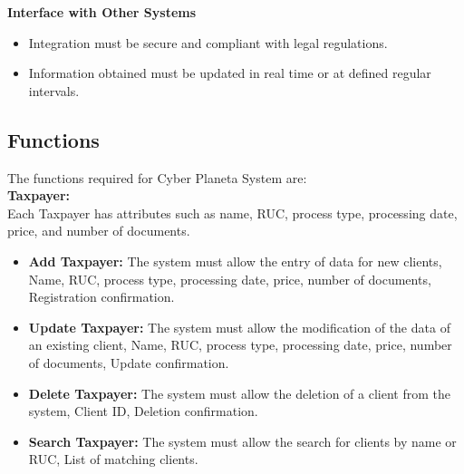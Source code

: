 \documentclass[12pt,a4paper, twosite]{article}
\begin{document}
\textbf {Interface with Other Systems}

\begin{itemize}
\item Integration must be secure and compliant with legal regulations.
\item Information obtained must be updated in real time or at defined regular intervals.
\end{itemize}

\subsection{Functions}
\label{sec:org307bb59}

The functions required for Cyber Planeta System are:\\

\textbf{Taxpayer:}\\
Each Taxpayer has attributes such as name, RUC, process type, processing date, price, and number of documents.
\begin{itemize}
\item \textbf {Add Taxpayer:}
The system must allow the entry of data for new clients, Name, RUC, process type, processing date, price, number of documents, Registration confirmation.
\end{itemize}
\begin{itemize}
\item \textbf {Update Taxpayer:}
The system must allow the modification of the data of an existing client, Name, RUC, process type, processing date, price, number of documents, Update confirmation.
\end{itemize}

\begin{itemize}
\item \textbf {Delete Taxpayer:}
The system must allow the deletion of a client from the system, Client ID, Deletion confirmation.
\end{itemize}

\begin{itemize}
\item \textbf {Search Taxpayer:}
The system must allow the search for clients by name or RUC, List of matching clients. 
\end{itemize}
\end{document}
